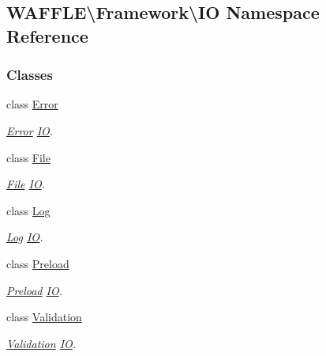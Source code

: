 \hypertarget{namespace_w_a_f_f_l_e_1_1_framework_1_1_i_o}{}\subsection{W\+A\+F\+F\+LE\textbackslash{}Framework\textbackslash{}IO Namespace Reference}
\label{namespace_w_a_f_f_l_e_1_1_framework_1_1_i_o}
\subsubsection*{Classes}
\begin{DoxyCompactItemize}
\item 
class \hyperlink{class_w_a_f_f_l_e_1_1_framework_1_1_i_o_1_1_error}{Error}
\begin{DoxyCompactList}\small\item\em \hyperlink{class_w_a_f_f_l_e_1_1_framework_1_1_i_o_1_1_error}{Error} \hyperlink{namespace_w_a_f_f_l_e_1_1_framework_1_1_i_o}{IO}. \end{DoxyCompactList}\item 
class \hyperlink{class_w_a_f_f_l_e_1_1_framework_1_1_i_o_1_1_file}{File}
\begin{DoxyCompactList}\small\item\em \hyperlink{class_w_a_f_f_l_e_1_1_framework_1_1_i_o_1_1_file}{File} \hyperlink{namespace_w_a_f_f_l_e_1_1_framework_1_1_i_o}{IO}. \end{DoxyCompactList}\item 
class \hyperlink{class_w_a_f_f_l_e_1_1_framework_1_1_i_o_1_1_log}{Log}
\begin{DoxyCompactList}\small\item\em \hyperlink{class_w_a_f_f_l_e_1_1_framework_1_1_i_o_1_1_log}{Log} \hyperlink{namespace_w_a_f_f_l_e_1_1_framework_1_1_i_o}{IO}. \end{DoxyCompactList}\item 
class \hyperlink{class_w_a_f_f_l_e_1_1_framework_1_1_i_o_1_1_preload}{Preload}
\begin{DoxyCompactList}\small\item\em \hyperlink{class_w_a_f_f_l_e_1_1_framework_1_1_i_o_1_1_preload}{Preload} \hyperlink{namespace_w_a_f_f_l_e_1_1_framework_1_1_i_o}{IO}. \end{DoxyCompactList}\item 
class \hyperlink{class_w_a_f_f_l_e_1_1_framework_1_1_i_o_1_1_validation}{Validation}
\begin{DoxyCompactList}\small\item\em \hyperlink{class_w_a_f_f_l_e_1_1_framework_1_1_i_o_1_1_validation}{Validation} \hyperlink{namespace_w_a_f_f_l_e_1_1_framework_1_1_i_o}{IO}. \end{DoxyCompactList}\end{DoxyCompactItemize}
